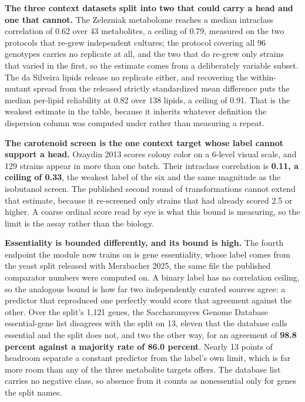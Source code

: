 \textbf{The three context datasets split into two that could carry a head and one that
cannot.} The Zelezniak metabolome reaches a median intraclass correlation of 0.62 over 43
metabolites, a ceiling of 0.79, measured on the two protocols that re-grew independent
cultures; the protocol covering all 96 genotypes carries no replicate at all, and the two
that do re-grew only strains that varied in the first, so the estimate comes from a
deliberately variable subset. The da Silveira lipids release no replicate either, and
recovering the within-mutant spread from the released strictly standardized mean difference
puts the median per-lipid reliability at 0.82 over 138 lipids, a ceiling of 0.91. That is
the weakest estimate in the table, because it inherits whatever definition the dispersion
column was computed under rather than measuring a repeat.

\textbf{The carotenoid screen is the one context target whose label cannot support a head.}
Ozaydin 2013 scores colony color on a 6-level visual scale, and 129 strains appear in more
than one batch. Their intraclass correlation is \textbf{0.11, a ceiling of 0.33}, the
weakest label of the six and the same magnitude as the isobutanol screen. The published
second round of transformations cannot extend that estimate, because it re-screened only
strains that had already scored 2.5 or higher. A coarse ordinal score read by eye is what
this bound is measuring, so the limit is the assay rather than the biology.

\textbf{Essentiality is bounded differently, and its bound is high.} The fourth endpoint the
module now trains on is gene essentiality, whose label comes from the yeast split released
with Merzbacher 2025, the same file the published comparator numbers were computed on. A
binary label has no correlation ceiling, so the analogous bound is how far two independently
curated sources agree: a predictor that reproduced one perfectly would score that agreement
against the other. Over the split's 1{,}121 genes, the Saccharomyces Genome Database
essential-gene list disagrees with the split on 13, eleven that the database calls essential
and the split does not, and two the other way, for an agreement of \textbf{98.8 percent
against a majority rate of 86.0 percent}. Nearly 13 points of headroom separate a constant
predictor from the label's own limit, which is far more room than any of the three
metabolite targets offers. The database list carries no negative class, so absence from it
counts as nonessential only for genes the split names.

